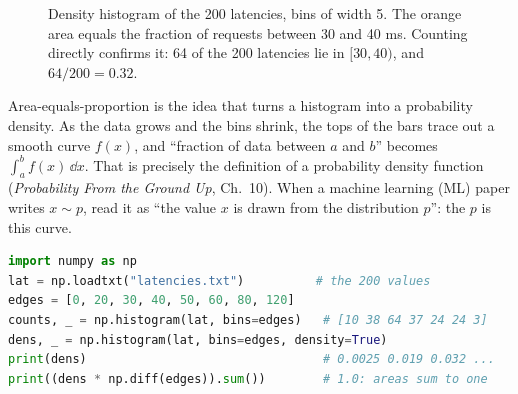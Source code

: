 \begin{figure}[H]
\centering
{}
\caption{Density histogram of the 200 latencies, bins of width 5. The orange area equals
the fraction of requests between 30 and 40 ms. Counting directly confirms it: 64 of the 200
latencies lie in $[30,40)$, and $64/200 = 0.32$.}
\label{fig:data-density-area}
\end{figure}

\begin{connectionbox}
Area-equals-proportion is the idea that turns a histogram into a probability density. As the
data grows and the bins shrink, the tops of the bars trace out a smooth curve $f(x)$, and
``fraction of data between $a$ and $b$'' becomes $\int_a^b f(x)\,\dd x$. That is precisely the
definition of a probability density function (\emph{Probability From the Ground Up}, Ch.~10).
When a machine learning (ML) paper writes $x \sim p$, read it as ``the value $x$ is drawn from the distribution $p$'': the $p$ is this curve.
\end{connectionbox}

\begin{lstlisting}[language=Python]
import numpy as np
lat = np.loadtxt("latencies.txt")          # the 200 values
edges = [0, 20, 30, 40, 50, 60, 80, 120]
counts, _ = np.histogram(lat, bins=edges)   # [10 38 64 37 24 24 3]
dens, _ = np.histogram(lat, bins=edges, density=True)
print(dens)                                 # 0.0025 0.019 0.032 ...
print((dens * np.diff(edges)).sum())        # 1.0: areas sum to one
\end{lstlisting}

